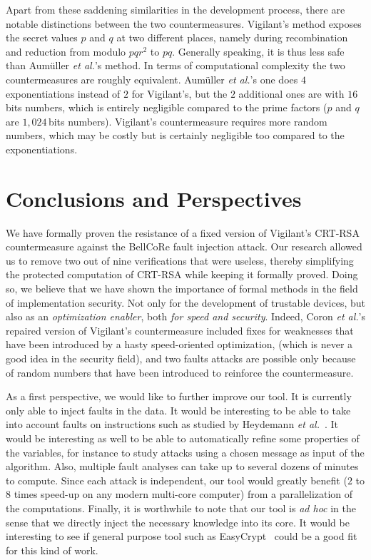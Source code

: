 \documentclass[10pt]{article}
\theoremstyle{definition}
\theoremstyle{theorem}
\newcommand{\etal}{\textit{et al.}\xspace}
\begin{document}
Apart from these saddening similarities in the development process, there are notable distinctions between the two countermeasures.
Vigilant's method exposes the secret values $p$ and $q$ at two different places, namely during recombination and reduction from modulo $pqr^2$ to $pq$.
Generally speaking, it is thus less safe than Aumüller \etal's method.
In terms of computational complexity the two countermeasures are roughly equivalent.
Aumüller \etal's one does $4$ exponentiations instead of $2$ for Vigilant's, but the $2$ additional ones are with $16$\,bits numbers, which is entirely negligible compared to the prime factors ($p$ and $q$ are $1,024$\,bits numbers).
Vigilant's countermeasure requires more random numbers, which may be costly but is certainly negligible too compared to the exponentiations.

\section{Conclusions and Perspectives}
\label{sec-concl}

We have formally proven the resistance of a fixed version of Vigilant's CRT-RSA countermeasure against the BellCoRe fault injection attack.
Our research allowed us to remove two out of nine verifications that were useless, thereby simplifying the protected computation of CRT-RSA while keeping it formally proved.
Doing so, we believe that we have shown the importance of formal methods in the field of implementation security.
Not only for the development of trustable devices, but also as an \emph{optimization enabler}, both \emph{for speed and security}.
Indeed, Coron \etal's repaired version of Vigilant's countermeasure included fixes for weaknesses that have been introduced by a hasty speed-oriented optimization, (which is never a good idea in the security field),
and two faults attacks are possible only because of random numbers that have been introduced to reinforce the countermeasure.

As a first perspective, we would like to further improve our tool.
It is currently only able to inject faults in the data.
It would be interesting to be able to take into account faults on instructions such as studied by Heydemann \etal~\cite{cryptoeprint:2013:679}.
It would be interesting as well to be able to automatically refine some properties of the variables, for instance to study attacks using a chosen message as input of the algorithm.
Also, multiple fault analyses can take up to several dozens of minutes to compute. Since each attack is independent, our tool would greatly benefit ($2$ to $8$ times speed-up on any modern multi-core computer) from a parallelization of the computations.
Finally, it is worthwhile to note that our tool is {\it ad hoc} in the sense that we directly inject the necessary knowledge into its core.
It would be interesting to see if general purpose tool such as EasyCrypt~\cite{Barthe:2009:POPL} could be a good fit for this kind of work.
\end{document}
